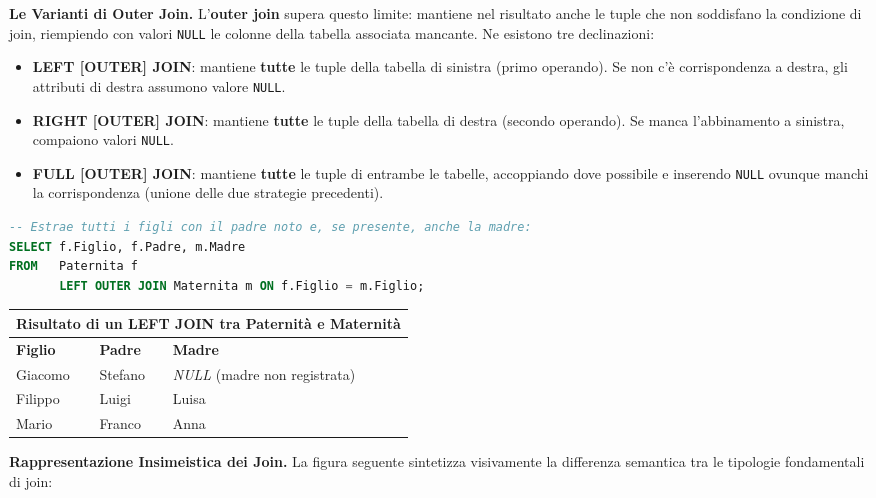 \documentclass[12pt]{extarticle}
\begin{document}
\medskip
\noindent \textbf{Le Varianti di Outer Join.} L'\textbf{outer join} supera questo limite: mantiene nel risultato anche le tuple che non soddisfano la condizione di join, riempiendo con valori \texttt{NULL} le colonne della tabella associata mancante. Ne esistono tre declinazioni:
\begin{itemize}
    \item \textbf{LEFT [OUTER] JOIN}: mantiene \textbf{tutte} le tuple della tabella di sinistra (primo operando). Se non c'è corrispondenza a destra, gli attributi di destra assumono valore \texttt{NULL}.
    \item \textbf{RIGHT [OUTER] JOIN}: mantiene \textbf{tutte} le tuple della tabella di destra (secondo operando). Se manca l'abbinamento a sinistra, compaiono valori \texttt{NULL}.
    \item \textbf{FULL [OUTER] JOIN}: mantiene \textbf{tutte} le tuple di entrambe le tabelle, accoppiando dove possibile e inserendo \texttt{NULL} ovunque manchi la corrispondenza (unione delle due strategie precedenti).
\end{itemize}

\begin{lstlisting}[language=SQL]
-- Estrae tutti i figli con il padre noto e, se presente, anche la madre:
SELECT f.Figlio, f.Padre, m.Madre
FROM   Paternita f
       LEFT OUTER JOIN Maternita m ON f.Figlio = m.Figlio;
\end{lstlisting}

\begin{center}
\small
\begin{tabular}{lll}
    \toprule
    \multicolumn{3}{c}{\textbf{Risultato di un LEFT JOIN tra Paternità e Maternità}} \\
    \midrule
    \textbf{Figlio} & \textbf{Padre} & \textbf{Madre} \\
    \midrule
    Giacomo & Stefano & \textit{NULL} \quad (madre non registrata) \\
    Filippo & Luigi   & Luisa \\
    Mario   & Franco  & Anna \\
    \bottomrule
\end{tabular}
\end{center}

\medskip
\noindent \textbf{Rappresentazione Insimeistica dei Join.} La figura seguente sintetizza visivamente la differenza semantica tra le tipologie fondamentali di join:
\end{document}
